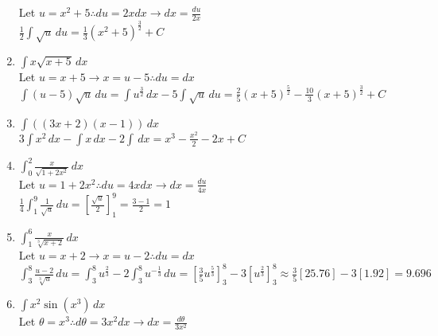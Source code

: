 \documentclass[10pt, letterpaper]{report}
\begin{document}
\begin{enumerate}
    Let $u=x^{2}+5\therefore du=2xdx\rightarrow dx=\frac{du}{2x}$ \\

    $\frac{1}{2}\int{\sqrt{u}}\,du=
    \frac{1}{3}(x^{2}+5)^{\frac{3}{2}}+C$ \\

  \item{$\int{x\sqrt{x+5}}\,dx$} \\

    Let $u=x+5\rightarrow x=u-5\therefore du=dx$ \\

    $\int{(u-5)\sqrt{u}}\,du=
    \int{u^{\frac{3}{2}}}\,dx-5\int{\sqrt{u}}\,du=
    \frac{2}{5}(x+5)^{\frac{5}{2}}-\frac{10}{3}(x+5)^{\frac{3}{2}}+C$ \\

  \item{$\int{((3x+2)(x-1))}\,dx$} \\

    $3\int{x^{2}}\,dx-\int{x}\,dx-2\int\,dx=
    x^{3}-\frac{x^{2}}{2}-2x+C$ \\

  \item{$\int_{0}^{2}{\frac{x}{\sqrt{1+2x^{2}}}}\,dx$} \\

    Let $u=1+2x^{2}\therefore du=4xdx\rightarrow dx=\frac{du}{4x}$ \\

    $\frac{1}{4}\int_{1}^{9}{\frac{1}{\sqrt{u}}}\,du=
    [\frac{\sqrt{u}}{2}]_{1}^{9}=\frac{3-1}{2}=1$ \\

  \item{$\int_{1}^{6}{\frac{x}{\sqrt[3]{x+2}}}\,dx$} \\

    Let $u=x+2\rightarrow x=u-2\therefore du=dx$ \\

    $\int_{3}^{8}{\frac{u-2}{\sqrt[3]{u}}}\,du=
    \int_{3}^{8}{u^{\frac{2}{3}}}-2\int_{3}^{8}{u^{-\frac{1}{3}}}\,du=
    [\frac{3}{5}u^{\frac{5}{3}}]_{3}^{8}-3[u^{\frac{2}{3}}]_{3}^{8}\approx
    \frac{3}{5}[25.76]-3[1.92]=9.696$ \\

  \item{$\int{x^{2}\sin{(x^{3})}}\,dx$} \\

    Let $\theta=x^{3}\therefore d\theta=3x^{2}dx\rightarrow dx=\frac{d\theta}{3x^2}$ \\


\end{enumerate}
\end{document}

